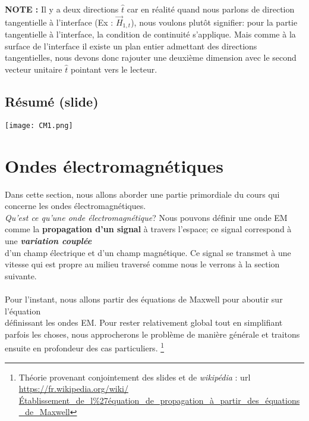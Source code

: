 \documentclass[a4paper,12pt]{article}
\begin{document}
 \textbf{NOTE : } Il y a deux directions $\hat{t}$ car en réalité quand nous parlons de direction tangentielle à l'interface (Ex : $\vec{H}_{1,t}$), 
 nous voulons plutôt signifier: pour la partie tangentielle à l'interface, la condition de continuité s'applique. Mais comme à la surface de l'interface il existe un plan entier admettant 
 des directions tangentielles, nous devons donc rajouter une deuxième dimension avec le second vecteur unitaire $\hat{t}$ pointant vers le lecteur.
 
 \subsection{Résumé (slide)}
 
 \texttt{[image: CM1.png]}

\newpage

\section{Ondes électromagnétiques}


Dans cette section, nous allons aborder une partie primordiale du cours qui concerne les ondes électromagnétiques. \\
\textit{Qu'est ce qu'une onde électromagnétique}? Nous pouvons définir une onde EM comme la \textbf{propagation d'un signal} à travers l'espace; 
ce signal correspond à une \textbf{\textit{variation couplée}} \\d'un champ électrique et d'un champ magnétique.  Ce signal se transmet à une vitesse qui est propre au milieu traversé comme nous le verrons à la section suivante. \\ \\
Pour l'instant, nous allons partir des équations de Maxwell pour aboutir sur l'équation\\ définissant les ondes EM. Pour rester relativement global tout en simplifiant parfois les choses, nous approcherons le problème de manière générale et traitons ensuite en profondeur des cas particuliers. 
\footnote{Théorie provenant conjointement des slides et de \textit{wikipédia} : url \url{https://fr.wikipedia.org/wiki/Établissement_de_l\%27équation_de_propagation_à_partir_des_équations_de_Maxwell}}
\end{document}

